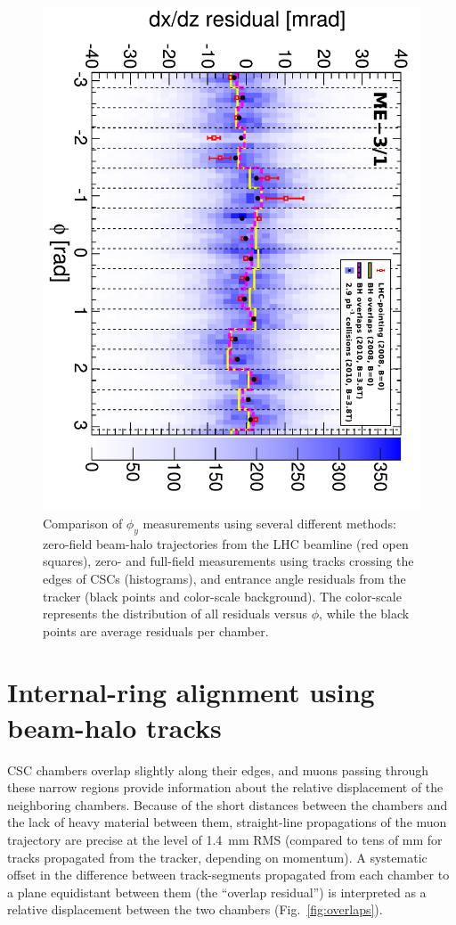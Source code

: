 \documentclass[12pt]{article}
\begin{document}
\begin{figure}
\begin{center}
\includegraphics[height=0.6\linewidth, angle=90]{mem3phiy_all.pdf}
\end{center}

\caption{Comparison of $\phi_y$ measurements using several different
  methods: zero-field beam-halo trajectories from the LHC beamline
  (red open squares), zero- and full-field measurements using tracks
  crossing the edges of CSCs (histograms), and entrance angle
  residuals from the tracker (black points and color-scale
  background).  The color-scale represents the distribution of all
  residuals versus $\phi$, while the black points are average
  residuals per chamber. \label{fig:mem3phiy_all}}
\end{figure}

\section{Internal-ring alignment using beam-halo tracks}

CSC chambers overlap slightly along their edges, and muons passing
through these narrow regions provide information about the relative
displacement of the neighboring chambers.  Because of the short
distances between the chambers and the lack of heavy material between
them, straight-line propagations of the muon trajectory are precise at
the level of 1.4~mm RMS (compared to tens of mm for tracks propagated
from the tracker, depending on momentum).  A systematic offset in the
difference between track-segments propagated from each chamber to a
plane equidistant between them (the ``overlap residual'') is
interpreted as a relative displacement between the two chambers
(Fig.~\ref{fig:overlaps}).
\end{document}
